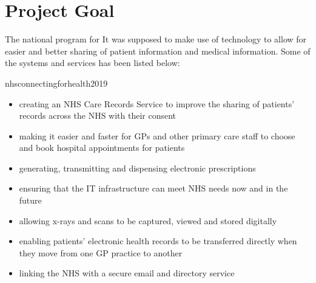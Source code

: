 \documentclass[a4paper,12pt]{scrartcl}
\begin{document}
	\section{Project Goal}
	{
		The national program for It was supposed to make use of technology to allow for easier and better sharing of patient information and medical information. Some of the systems and services has been listed below:
		\begin{displaycquote}{nhsconnectingforhealth2019}
			\begin{itemize}
				\item {creating an NHS Care Records Service to improve the sharing of patients' records across the NHS with their consent}
				\item {making it easier and faster for GPs and other primary care staff to choose and book hospital appointments for patients}
				\item {generating, transmitting and dispensing electronic prescriptions}
				\item {ensuring that the IT infrastructure can meet NHS needs now and in the future}
				\item {allowing x-rays and scans to be captured, viewed and stored digitally}
				\item {enabling patients' electronic health records to be transferred directly when they move from one GP practice to another}
				\item {linking the NHS with a secure email and directory service}
			\end{itemize}
		\end{displaycquote}
	}
\end{document}
